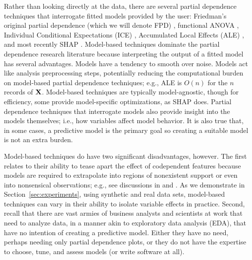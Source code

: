 \documentclass{article}
\newcommand{\secref}[1]{Section~\ref{#1}}
\begin{document}
Rather than looking directly at the data, there are several partial dependence techniques that interrogate fitted models provided by the user: Friedman's original partial dependence (which we will denote FPD) \citet{PDP}, functional ANOVA \citet{fanova}, Individual Conditional Expectations (ICE) \citet{ICE}, Accumulated Local Effects (ALE) \citet{ALE}, and most recently SHAP \citet{shap}.  Model-based techniques dominate the partial dependence research literature because interpreting the output of a fitted model  has several advantages. Models have a tendency to smooth over noise. Models act like analysis preprocessing steps, potentially reducing the computational burden on model-based partial dependence techniques; e.g., ALE is $O(n)$ for the $n$ records of $\bf X$. Model-based techniques are typically model-agnostic, though for efficiency, some provide model-specific optimizations, as SHAP does. Partial dependence techniques that interrogate models also provide insight into the models themselves; i.e., how variables affect model behavior.  It is also true that, in some cases, a predictive model is the primary goal so creating a suitable model is not an extra burden.

Model-based techniques do have two significant disadvantages, however. 
The first relates to their ability to tease apart the effect of codependent features because models are required to extrapolate into regions of nonexistent support or even into nonsensical observations; e.g., see discussions in \cite{ALE} and \cite{fanova}.  As we demonstrate in \secref{sec:experiments}, using synthetic and real data sets, model-based techniques can vary in their ability to isolate variable effects in practice.  Second, recall that there are vast armies of business analysts and scientists at work that need to analyze data, in a manner akin to exploratory data analysis (EDA), that have no intention of creating a predictive model.  Either they have no need, perhaps needing only partial dependence plots, or they do not have the expertise to choose, tune, and assess models (or write software at all).
\end{document}
